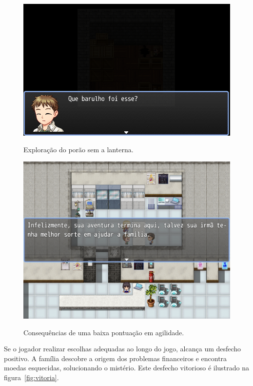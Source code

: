 \begin{figure}[!htbp]
	\centering
	\caption{Exploração do porão sem a lanterna.}
	\includegraphics[scale=0.55]{Textuais/Pictures/explorando-porao-sem-lanterna.png}
	\label{fig:explorando-porao-sem-lanterna}
\end{figure}

\begin{figure}[!htbp]
	\centering
	\caption{Consequências de uma baixa pontuação em agilidade.}
	\includegraphics[scale=0.4]{Textuais/Pictures/game-over.png}
	\label{fig:game-over}
\end{figure}

\newpage
\newpage

Se o jogador realizar escolhas adequadas ao longo do jogo, alcança um desfecho positivo. A família descobre a origem dos problemas financeiros e encontra moedas esquecidas, solucionando o mistério. Este desfecho vitorioso é ilustrado na figura~\ref{fig:vitoria}.

